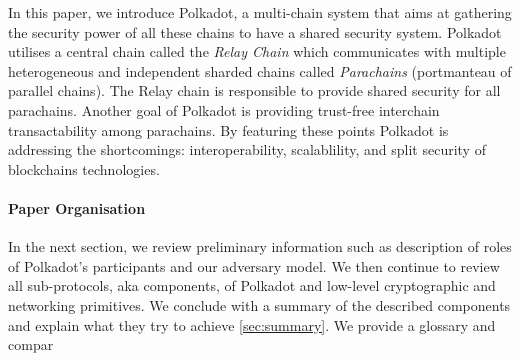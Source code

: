 In this paper, we introduce Polkadot, a multi-chain system that aims at gathering the security power of all these chains to have a shared security system. Polkadot utilises a central chain called the \emph{Relay Chain} which communicates with multiple heterogeneous and independent sharded chains called \emph{Parachains} (portmanteau of parallel chains). The Relay chain is responsible to provide shared security for all parachains. Another goal of Polkadot is providing trust-free interchain transactability among parachains. By featuring these points Polkadot is  addressing the shortcomings: interoperability, scalablility, and split security of blockchains technologies.

\paragraph{Paper Organisation} In the next section, we review preliminary information such as description of roles of Polkadot's participants and our adversary model. We then continue to review all sub-protocols, aka components, of Polkadot and low-level cryptographic and networking primitives. We conclude with a summary of the described components and explain what they try to achieve \ref{sec:summary}. We provide a glossary and compar





